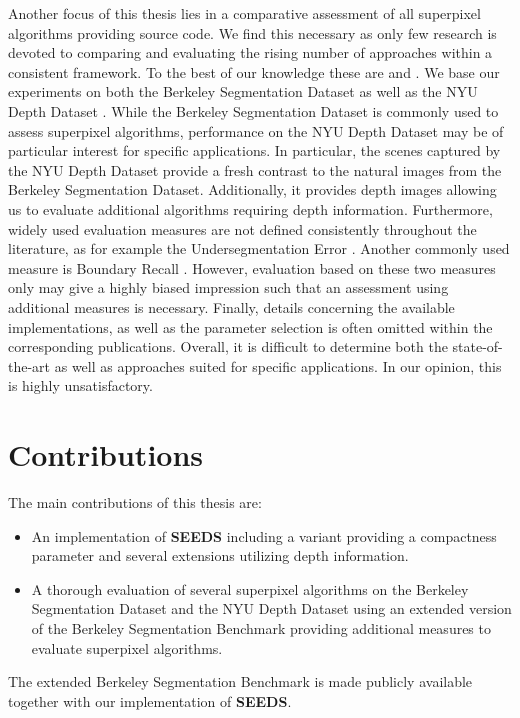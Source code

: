 Another focus of this thesis lies in a comparative assessment of all superpixel algorithms providing source code. We find this necessary as only few research is devoted to comparing and evaluating the rising number of approaches within a consistent framework. To the best of our knowledge these are \cite{SchickFischerStiefelhagen:2012, NeubertProtzel:2012} and \cite{AchantaShajiSmithLucchiFuaSuesstrunk:2012}. We base our experiments on both the Berkeley Segmentation Dataset \cite{ArbelaezMaireFowlkesMalik:2011} as well as the NYU Depth Dataset \cite{SilbermanHoiemKohliFergus:2012}. While the Berkeley Segmentation Dataset is commonly used to assess superpixel algorithms, performance on the NYU Depth Dataset may be of particular interest for specific applications. In particular, the scenes captured by the NYU Depth Dataset provide a fresh contrast to the natural images from the Berkeley Segmentation Dataset. Additionally, it provides depth images allowing us to evaluate additional algorithms requiring depth information. Furthermore, widely used evaluation measures are not defined consistently throughout the literature, as for example the Undersegmentation Error \cite{NeubertProtzel:2012, AchantaShajiSmithLucchiFuaSuesstrunk:2012}. Another commonly used measure is Boundary Recall \cite{MartinFowlkesMalik:2004}. However, evaluation based on these two measures only may give a highly biased impression such that an assessment using additional measures is necessary. Finally, details concerning the available implementations, as well as the parameter selection is often omitted within the corresponding publications. Overall, it is difficult to determine both the state-of-the-art as well as approaches suited for specific applications. In our opinion, this is highly unsatisfactory.

\section{Contributions}

The main contributions of this thesis are:~
\begin{itemize}
	\item An implementation of \textbf{SEEDS} including a variant providing a compactness parameter \cite{VanDenBerghBoixRoigVanGool:2013} and several extensions utilizing depth information.
	\item A thorough evaluation of several superpixel algorithms on the Berkeley Segmentation Dataset and the NYU Depth Dataset using an extended version of the Berkeley Segmentation Benchmark providing additional measures to evaluate superpixel algorithms.
\end{itemize}
The extended Berkeley Segmentation Benchmark is made publicly available together with our implementation of \textbf{SEEDS}.

